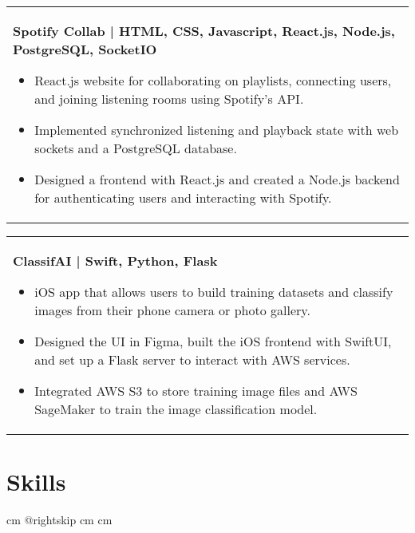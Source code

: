 \documentclass[10pt, a4paper]{article}
\newenvironment{highlights}{
        \begin{itemize}[
                topsep=0pt,
                parsep=0.10 cm,
                partopsep=0pt,
                itemsep=0pt,
                after=\vspace{-1\baselineskip},
                leftmargin=0.4 cm + 3pt
            ]
    }{
        \end{itemize}
    } %
\begin{document}
        \begin{tabularx}{ cm-0.13cm}{K{0.2 cm}}
            \textbf{Spotify Collab | HTML, CSS, Javascript, React.js, Node.js, PostgreSQL, SocketIO}
            \vspace{0.10 cm}
            \begin{highlights}
                \item React.js website for collaborating on playlists, connecting users, and joining listening rooms using Spotify’s API. 
                \item Implemented synchronized listening and playback state with web sockets and a PostgreSQL database. 
                \item Designed a frontend with React.js and created a Node.js backend for authenticating users and interacting with Spotify. \hspace*{-0.2cm}
            \end{highlights}
        \end{tabularx}

        \vspace{0.12 cm}
        \begin{tabularx}{ cm-0.13cm}{K{0.2 cm}}
            \textbf{ClassifAI | Swift, Python, Flask}
            \vspace{0.10 cm}
            \begin{highlights}
                \item iOS app that allows users to build training datasets and classify images from their phone camera or photo gallery. 
                \item Designed the UI in Figma, built the iOS frontend with SwiftUI, and set up a Flask server to interact with AWS services. 
                \item Integrated AWS S3 to store training image files and AWS SageMaker to train the image classification model. \hspace*{-0.2cm}
            \end{highlights}
        \end{tabularx}



    \section{Skills}
    
            \begingroup\raggedright    {} cm
            \advance\csname @rightskip cm
            \advance{} cm
\end{document}
